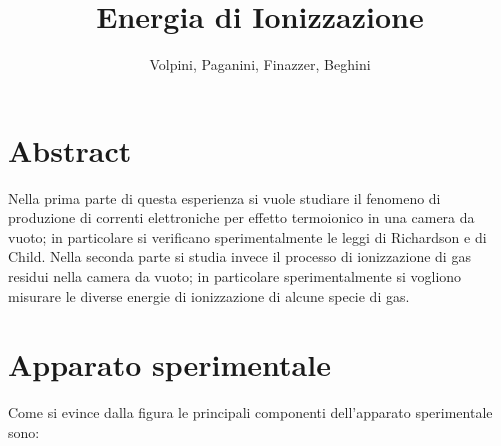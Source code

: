 \documentclass[11pt,a4paper]{article}
\author{Volpini, Paganini, Finazzer, Beghini}
\title{Energia di Ionizzazione }
\begin{document}
\maketitle 
\section{Abstract}
Nella prima parte di questa esperienza si vuole studiare il fenomeno di produzione di correnti elettroniche per effetto termoionico in una camera da vuoto; in particolare si verificano sperimentalmente le leggi di Richardson e di Child. Nella seconda parte si studia invece il processo di ionizzazione di gas residui nella camera da vuoto; in particolare sperimentalmente si vogliono misurare le diverse energie di ionizzazione di alcune specie di gas.  
\section{Apparato sperimentale}



Come si evince dalla figura le principali componenti dell'apparato sperimentale sono:
\end{document}
